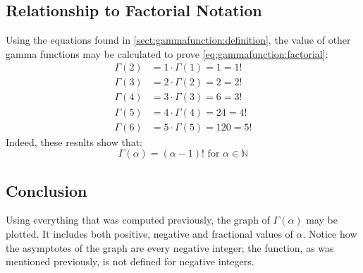 \documentclass[12pt]{article}
\begin{document}

\pagebreak
\subsection{Relationship to Factorial Notation}
Using the equations found in \autoref{sect:gammafunction:definition}, the value of other gamma functions may be calculated to prove \autoref{eq:gammafunction:factorial}:
\begin{equation*}
	\begin{split}
		\Gamma(2)	&=	1\cdot\Gamma(1)	=	1	=	1!\\
		\Gamma(3)	&=	2\cdot\Gamma(2)	=	2	=	2!\\
		\Gamma(4)	&=	3\cdot\Gamma(3)	=	6	=	3!\\
		\Gamma(5)	&=	4\cdot\Gamma(4)	=	24	=	4!\\
		\Gamma(6)	&=	5\cdot\Gamma(5)	=	120	=	5!
	\end{split}
\end{equation*}
Indeed, these results show that:
\begin{equation*}
	\Gamma(\alpha)=(\alpha-1)!\text{ for }\alpha\in\mathbb{N}
\end{equation*}


\pagebreak
\subsection{Conclusion}
Using everything that was computed previously, the graph of $\Gamma(\alpha)$ may be plotted. It includes both positive,
negative and fractional values of $\alpha$. Notice how the asymptotes of the graph are every negative integer; the function, as was mentioned previously, is not defined for negative integers.
\end{document}
